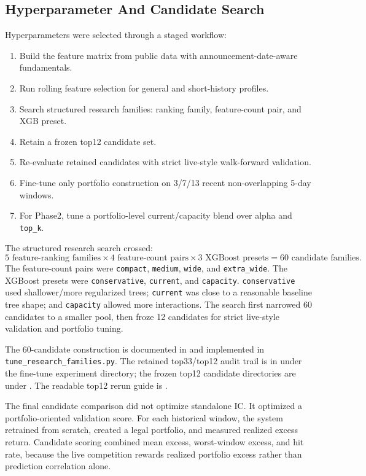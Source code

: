 \documentclass[11pt]{article}
\begin{document}
\subsection{Hyperparameter And Candidate Search}

Hyperparameters were selected through a staged workflow:
\begin{enumerate}
  \item Build the feature matrix from public data with announcement-date-aware fundamentals.
  \item Run rolling feature selection for general and short-history profiles.
  \item Search structured research families: ranking family, feature-count pair, and XGB preset.
  \item Retain a frozen top12 candidate set.
  \item Re-evaluate retained candidates with strict live-style walk-forward validation.
  \item Fine-tune only portfolio construction on 3/7/13 recent non-overlapping 5-day windows.
  \item For Phase2, tune a portfolio-level current/capacity blend over alpha and \texttt{top\_k}.
\end{enumerate}

The structured research search crossed:
\[
5 \text{ feature-ranking families}
\times 4 \text{ feature-count pairs}
\times 3 \text{ XGBoost presets}
= 60 \text{ candidate families}.
\]
The feature-count pairs were \texttt{compact}, \texttt{medium}, \texttt{wide},
and \texttt{extra\_wide}. The XGBoost presets were \texttt{conservative},
\texttt{current}, and \texttt{capacity}. \texttt{conservative} used
shallower/more regularized trees; \texttt{current} was close to a reasonable
baseline tree shape; and \texttt{capacity} allowed more interactions. The
search first narrowed 60 candidates to a smaller pool, then froze 12 candidates
for strict live-style validation and portfolio tuning.

The 60-candidate construction is documented in
 and implemented in
\texttt{tune\_research\_families.py}. The retained top33/top12 audit trail is in
 under the fine-tune experiment directory; the
frozen top12 candidate directories are under .
The readable top12 rerun guide is .

The final candidate comparison did not optimize standalone IC. It optimized a
portfolio-oriented validation score. For each historical window, the system
retrained from scratch, created a legal portfolio, and measured realized excess
return. Candidate scoring combined mean excess, worst-window excess, and hit
rate, because the live competition rewards realized portfolio excess rather
than prediction correlation alone.
\end{document}
